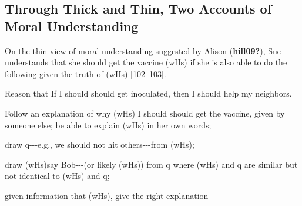 \documentclass[12pt]{book}
\theoremstyle{definition}
\theoremstyle{remark}
\newcommand{\NormalTok}[1]{#1}
\newenvironment{Shaded}{}{}
\newenvironment{Highlighting}{}{}
\begin{document}
\subsection*{Through Thick and Thin, Two Accounts of Moral Understanding}\label{through-thick-and-thin-two-accounts-of-moral-understanding}

On the thin view of moral understanding suggested by Alison (\textbf{hill09?}), Sue understands that she should get the vaccine (wHs) if she is also able to do the following given the truth of (wHs) {[}102--103{]}.

\begin{Shaded}
\begin{Highlighting}[]

\NormalTok{Reason that \textquotesingle{}If I should should get inoculated, then I should help my neighbors.\textquotesingle{}}
\end{Highlighting}
\end{Shaded}

\begin{Shaded}
\begin{Highlighting}[]

\NormalTok{Follow an explanation of why (wHs) \textquotesingle{}I should should get the vaccine,\textquotesingle{} given by someone else; be able to explain (wHs) in her own words;}
\end{Highlighting}
\end{Shaded}

\begin{Shaded}
\begin{Highlighting}[]

\NormalTok{draw q{-}{-}{-}e.g., we should not hit others{-}{-}{-}from (wHs);}
\end{Highlighting}
\end{Shaded}

\begin{Shaded}
\begin{Highlighting}[]

\NormalTok{draw (wHs)\textquotesingle{}{-}{-}{-}say Bob{-}{-}{-}(or likely (wHs)\textquotesingle{}) from q\textquotesingle{} where (wHs)\textquotesingle{} and q\textquotesingle{} are similar but not identical to (wHs) and q;}
\end{Highlighting}
\end{Shaded}

\begin{Shaded}
\begin{Highlighting}[]

\NormalTok{given information that (wHs), give the right explanation}
\end{Highlighting}
\end{Shaded}
\end{document}
